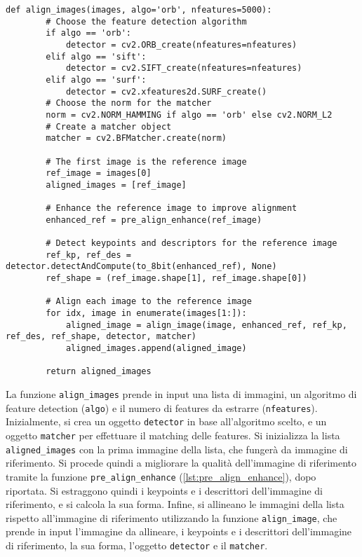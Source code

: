 \begin{lstlisting}[label={lst:alignment}]
    def align_images(images, algo='orb', nfeatures=5000):
        # Choose the feature detection algorithm
        if algo == 'orb':
            detector = cv2.ORB_create(nfeatures=nfeatures)
        elif algo == 'sift':
            detector = cv2.SIFT_create(nfeatures=nfeatures)            
        elif algo == 'surf':
            detector = cv2.xfeatures2d.SURF_create()
        # Choose the norm for the matcher
        norm = cv2.NORM_HAMMING if algo == 'orb' else cv2.NORM_L2
        # Create a matcher object
        matcher = cv2.BFMatcher.create(norm)

        # The first image is the reference image
        ref_image = images[0]
        aligned_images = [ref_image]

        # Enhance the reference image to improve alignment
        enhanced_ref = pre_align_enhance(ref_image)

        # Detect keypoints and descriptors for the reference image
        ref_kp, ref_des = detector.detectAndCompute(to_8bit(enhanced_ref), None)
        ref_shape = (ref_image.shape[1], ref_image.shape[0])

        # Align each image to the reference image
        for idx, image in enumerate(images[1:]):
            aligned_image = align_image(image, enhanced_ref, ref_kp, ref_des, ref_shape, detector, matcher)
            aligned_images.append(aligned_image)

        return aligned_images
\end{lstlisting}

La funzione \texttt{align\_images} prende in input una lista di immagini, un algoritmo di feature detection (\texttt{algo}) e il numero di features da estrarre (\texttt{nfeatures}). Inizialmente, si crea un oggetto \texttt{detector} in base all'algoritmo scelto, e un oggetto \texttt{matcher} per effettuare il matching delle features. Si inizializza la lista \texttt{aligned\_images} con la prima immagine della lista, che fungerà da immagine di riferimento. Si procede quindi a migliorare la qualità dell'immagine di riferimento tramite la funzione \texttt{pre\_align\_enhance} (\cref{lst:pre_align_enhance}), dopo riportata. Si estraggono quindi i keypoints e i descrittori dell'immagine di riferimento, e si calcola la sua forma. Infine, si allineano le immagini della lista rispetto all'immagine di riferimento utilizzando la funzione \texttt{align\_image}, che prende in input l'immagine da allineare, i keypoints e i descrittori dell'immagine di riferimento, la sua forma, l'oggetto \texttt{detector} e il \texttt{matcher}.

